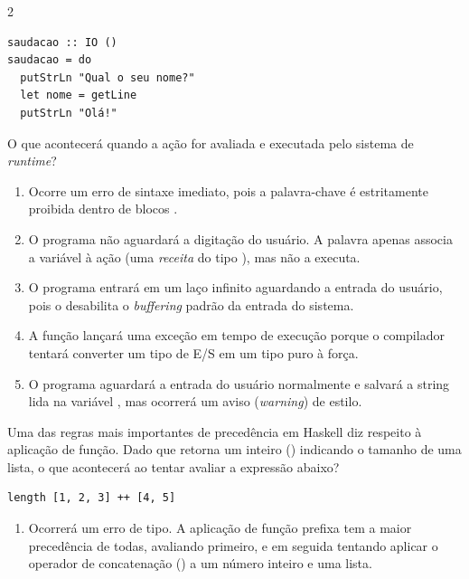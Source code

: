 \documentclass[a4paper,10pt,brazil]{article}
\begin{document}
\begin{multicols}{2}
\begin{verbatim}
saudacao :: IO ()
saudacao = do
  putStrLn "Qual o seu nome?"
  let nome = getLine
  putStrLn "Olá!"
\end{verbatim}

O que acontecerá quando a ação  for avaliada e executada pelo sistema de \emph{runtime}?

\begin{enumerate}
  \item Ocorre um erro de sintaxe imediato, pois a palavra-chave  é estritamente proibida dentro de blocos .

  \item O programa não aguardará a digitação do usuário. A palavra  apenas associa a variável  à ação (uma \emph{receita} do tipo ), mas não a executa.

  \item O programa entrará em um laço infinito aguardando a entrada do usuário, pois o  desabilita o \emph{buffering} padrão da entrada do sistema.

  \item A função  lançará uma exceção em tempo de execução porque o compilador tentará converter um tipo de E/S em um tipo puro à força.

  \item O programa aguardará a entrada do usuário normalmente e salvará a string lida na variável , mas ocorrerá um aviso (\emph{warning}) de estilo.


\end{enumerate}

Uma das regras mais importantes de precedência em Haskell diz respeito à aplicação de função. Dado que  retorna um inteiro () indicando o tamanho de uma lista, o que acontecerá ao tentar avaliar a expressão abaixo?
\begin{verbatim}
length [1, 2, 3] ++ [4, 5]
\end{verbatim}

\begin{enumerate}
  \item Ocorrerá um erro de tipo. A aplicação de função prefixa tem a maior precedência de todas, avaliando  primeiro, e em seguida tentando aplicar o operador de concatenação (\haskellinline{++}) a um número inteiro e uma lista.


\end{enumerate}
\end{multicols}
\end{document}
